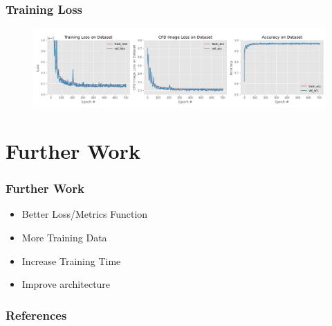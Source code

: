 \documentclass{beamer}
\begin{document}
\begin{frame}
\frametitle{Training Loss}
\begin{figure}[h]
\hspace{-1cm}
\includegraphics[width=12cm,trim = 0cm 0cm 13cm 0cm, clip]{../../../plots/all_history.png}
\end{figure}
\end{frame}

\section{Further Work} %

\begin{frame}
\frametitle{Further Work}
\begin{itemize}
\item Better Loss/Metrics Function
\item More Training Data
\item Increase Training Time
\item Improve architecture
\end{itemize}
\end{frame}


\begin{frame}[t,allowframebreaks]
\frametitle{References}
\begin{refsection}
\printbibliography[keyword=secondary, title={List of Publications}]
\end{refsection}
%
\printbibliography
\end{frame}

\end{document}
